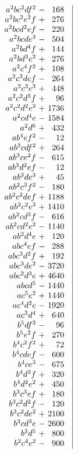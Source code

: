 \[\begin{array}{@{}c|c|c|c@{}}
\begin{array}{r@{\ }c@{\ }r}
a^2bc^2df^2&-&168\\
a^2bc^2e^2f&+&276\\
a^2bcd^2ef&-&220\\
a^2bcde^3&-&504\\
a^2bd^4f&+&144\\
a^2bd^3e^2&+&276\\
a^2c^4f^2&+&108\\
a^2c^3def&-&264\\
a^2c^3e^3&+&448\\
a^2c^2d^3f&+&96\\
a^2c^2d^2e^2&+&1736\\
a^2cd^4e&-&1584\\
a^2d^6&+&432\\
ab^4ef^2&-&12\\
ab^3cdf^2&+&264\\
ab^3ce^2f&-&615\\
ab^3d^2ef&-&12\\
ab^3de^3&+&45\\
ab^2c^3f^2&-&180\\
ab^2c^2def&+&1188\\
ab^2c^2e^3&+&1410\\
ab^2cd^3f&-&616\\
ab^2cd^2e^2&-&1140\\
ab^2d^4e&+&120\\
abc^4ef&-&288\\
abc^3d^2f&+&192\\
abc^3de^2&-&3720\\
abc^2d^3e&+&4640\\
abcd^5&-&1440\\
ac^5e^2&+&1440\\
ac^4d^2e&-&1920\\
ac^3d^4&+&640\\
b^5df^3&-&96\\
b^5e^2f&+&270\\
b^4c^2f^2&+&72\\
b^4cdef&-&600\\
b^4ce^3&-&675\\
b^4d^3f&+&320\\
b^4d^2e^2&+&450\\
b^3c^3ef&+&180\\
b^3c^2d^2f&-&120\\
b^3c^2de^2&+&2100\\
b^3cd^3e&-&2600\\
b^3d^5&+&800\\
b^2c^4e^2&-&900\\

\end{array}
\end{array}\]
